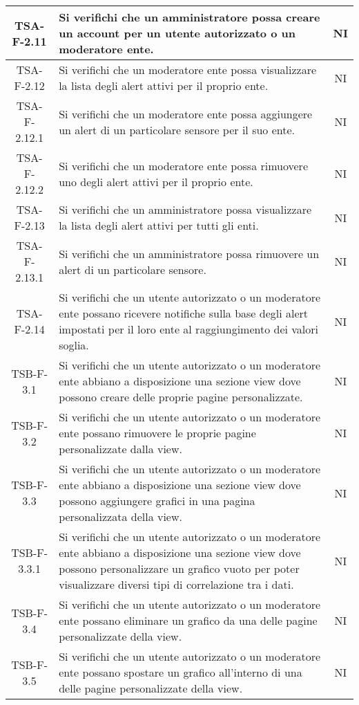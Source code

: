 \begin{center}
\begin{longtable}{|c|p{10cm}|c|}
			 \hline
			 TSA-F-2.11 & Si verifichi che un amministratore possa creare un account per un utente autorizzato o un moderatore ente. & NI \\  
			 \hline
			 TSA-F-2.12 & Si verifichi che un moderatore ente possa visualizzare la lista degli alert attivi per il proprio ente. & NI \\
			 \hline
			 TSA-F-2.12.1 & Si verifichi che un moderatore ente possa aggiungere un alert di un particolare sensore per il suo ente. & NI \\
			 \hline
			 TSA-F-2.12.2 & Si verifichi che un moderatore ente possa rimuovere uno degli alert attivi per il proprio ente. & NI \\
			 \hline
			 TSA-F-2.13 & Si verifichi che un amministratore possa visualizzare la lista degli alert attivi per tutti gli enti. & NI \\
			 \hline
			 TSA-F-2.13.1 & Si verifichi che un amministratore possa rimuovere un alert di un particolare sensore. & NI \\
			 \hline
			 TSA-F-2.14 & Si verifichi che un utente autorizzato o un moderatore ente possano ricevere notifiche sulla base degli alert impostati per il loro ente al raggiungimento dei valori soglia. & NI \\
			 \hline
			 TSB-F-3.1 & Si verifichi che un utente autorizzato o un moderatore ente abbiano a disposizione una sezione view dove possono creare delle proprie pagine personalizzate. & NI \\
			 \hline
			 TSB-F-3.2 & Si verifichi che un utente autorizzato o un moderatore ente possano rimuovere le proprie pagine personalizzate dalla view. & NI \\
			 \hline
			 TSB-F-3.3 & Si verifichi che un utente autorizzato o un moderatore ente abbiano a disposizione una sezione view dove possono aggiungere grafici in una pagina personalizzata della view. & NI \\
			 \hline
			 TSB-F-3.3.1 & Si verifichi che un utente autorizzato o un moderatore ente abbiano a disposizione una sezione view dove possono personalizzare un grafico vuoto per poter visualizzare diversi tipi di correlazione tra i dati. & NI \\
			 \hline
			 TSB-F-3.4 & Si verifichi che un utente autorizzato o un moderatore ente possano eliminare un grafico da una delle pagine personalizzate della view. & NI \\
			 \hline
			 TSB-F-3.5 & Si verifichi che un utente autorizzato o un moderatore ente possano spostare un grafico all'interno di una delle pagine personalizzate della view. & NI \\

\end{longtable}
\end{center}
